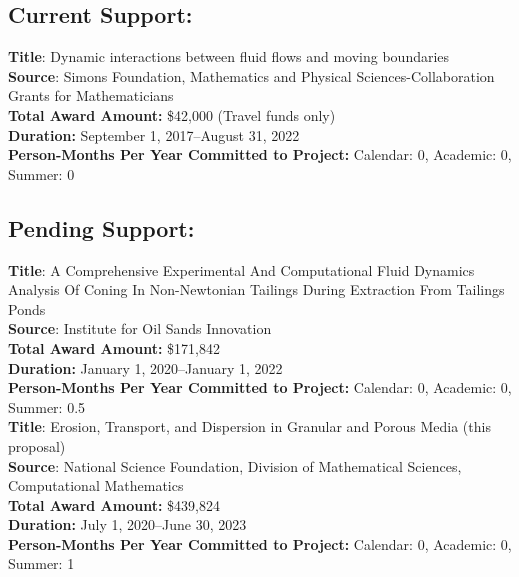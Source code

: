 \documentclass[11pt]{article}
\begin{document}
\subsection*{Current Support:}

{\bf Title}: Dynamic interactions between fluid flows and moving boundaries \\
{\bf Source}: Simons Foundation, Mathematics and Physical
Sciences-Collaboration Grants for Mathematicians \\
{\bf Total Award Amount:} \$42,000 (Travel funds only) \\
{\bf Duration:} September 1, 2017--August 31, 2022 \\
{\bf Person-Months Per Year Committed to Project:} Calendar: 0,
Academic: 0, Summer: 0 \\


\subsection*{Pending Support:}

\noindent
{\bf Title}:  A Comprehensive Experimental And Computational Fluid Dynamics Analysis Of Coning In Non-Newtonian Tailings During Extraction From Tailings Ponds \\
{\bf Source}:  Institute for Oil Sands Innovation\\
{\bf Total Award Amount:} \$171,842 \\
{\bf Duration:}  January 1, 2020--January 1, 2022\\
{\bf Person-Months Per Year Committed to Project:} Calendar: 0,
Academic: 0, Summer: 0.5 \\

{\bf Title}: Erosion, Transport, and Dispersion in Granular and Porous
Media (this proposal) \\
{\bf Source}: National Science Foundation, Division of Mathematical
Sciences, Computational Mathematics \\
{\bf Total Award Amount:} \$439,824 \\ %
{\bf Duration:} July 1, 2020--June 30, 2023 \\
{\bf Person-Months Per Year Committed to Project:} Calendar: 0,
Academic: 0, Summer: 1 \\
\end{document}
